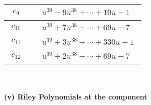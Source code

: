 \documentclass[1p]{elsarticle_modified}
\theoremstyle{definition}
\begin{document}
\begin{tabular}{m{50pt}|m{274pt}}
\hline $$\begin{aligned}c_{9}\end{aligned}$$&$\begin{aligned}
&u^{39}-9 u^{38}+\cdots+10 u-1
\end{aligned}$\\
\hline $$\begin{aligned}c_{10}\end{aligned}$$&$\begin{aligned}
&u^{39}+7 u^{38}+\cdots+69 u+7
\end{aligned}$\\
\hline $$\begin{aligned}c_{11}\end{aligned}$$&$\begin{aligned}
&u^{39}+3 u^{38}+\cdots+330 u+1
\end{aligned}$\\
\hline $$\begin{aligned}c_{12}\end{aligned}$$&$\begin{aligned}
&u^{39}+2 u^{38}+\cdots+69 u-7
\end{aligned}$\\
\hline
\end{tabular}\\~\\
\newpage\renewcommand{\arraystretch}{1}
\flushleft \textbf{(v) Riley Polynomials at the component}\newline \\
\end{document}
